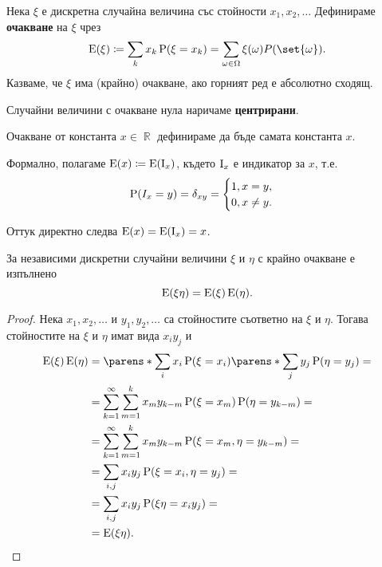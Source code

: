 \documentclass{../../common/topic}
\begin{document}
\begin{definition}
  Нека \( \xi \) е дискретна случайна величина със стойности \( x_1, x_2, \ldots \) Дефинираме \textbf{очакване} на \( \xi \) чрез
  \begin{equation*}
    \Expect(\xi) \coloneqq \sum_k x_k \Prob(\xi = x_k) = \sum_{\omega \in \Omega} \xi(\omega) P(\set{ \omega }).
  \end{equation*}
  Казваме, че \( \xi \) има (крайно) очакване, ако горният ред е абсолютно сходящ.

  Случайни величини с очакване нула наричаме \textbf{центрирани}.

  Очакване от константа \( x \in \BbbR \) дефинираме да бъде самата константа \( x \).
\end{definition}

\begin{remark}
  Формално, полагаме \( \operatorname{E}(x) \coloneqq \operatorname{E}(\operatorname{I}_x) \), където \( \operatorname{I}_x \) е индикатор за \( x \), т.е.
  \begin{equation*}
    \operatorname{P}(I_x = y) = \delta_{xy} = \begin{cases}
      1, x = y, \\
      0, x \neq y.
    \end{cases}
  \end{equation*}

  Оттук директно следва \( \operatorname{E}(x) = \operatorname{E}(\operatorname{I}_x) = x \).
\end{remark}

\begin{proposition}\label{thm:expectation_of_independent_product}
  За независими дискретни случайни величини \( \xi \) и \( \eta \) с крайно очакване е изпълнено
  \begin{equation*}
    \operatorname{E}(\xi \eta) = \operatorname{E}(\xi) \operatorname{E}(\eta).
  \end{equation*}
\end{proposition}
\begin{proof}
  Нека \( x_1, x_2, \ldots \) и \( y_1, y_2, \ldots \) са стойностите съответно на \( \xi \) и \( \eta \). Тогава стойностите на \( \xi \) и \( \eta \) имат вида \( x_i y_j \) и
  \begin{align*}
    \Expect(\xi) \Expect(\eta)
    &=
    \parens*{ \sum_i x_i \Prob(\xi = x_i) } \parens*{ \sum_j y_j \Prob(\eta = y_j) }
    = \\ &=
    \sum_{k=1}^\infty \sum_{m=1}^k x_m y_{k-m} \Prob(\xi = x_m) \Prob(\eta = y_{k-m})
    = \\ &=
    \sum_{k=1}^\infty \sum_{m=1}^k x_m y_{k-m} \Prob(\xi = x_m, \eta = y_{k-m})
    = \\ &=
    \sum_{i, j} x_i y_j \Prob(\xi = x_i, \eta = y_j)
    = \\ &=
    \sum_{i, j} x_i y_j \Prob(\xi \eta = x_i y_j)
    = \\ &=
    \Expect(\xi \eta).
  \end{align*}
\end{proof}
\end{document}
